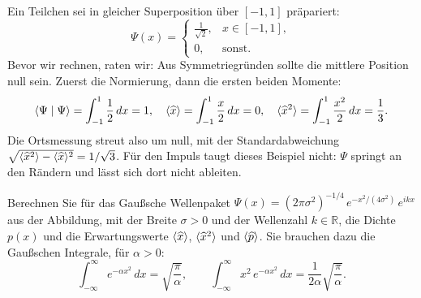 \begin{beispiel}
	Ein Teilchen sei in gleicher Superposition über $[-1,1]$ präpariert:
	\begin{equation}
		\Psi(x) = \begin{cases} \frac{1}{\sqrt2}, & x\in[-1,1], \\ 0, & \text{sonst}. \end{cases}
	\end{equation}
	Bevor wir rechnen, raten wir: Aus Symmetriegründen sollte die mittlere Position null sein. Zuerst die Normierung, dann die ersten beiden Momente:
	\begin{equation}
		\langle \Psi \mid \Psi \rangle = \int_{-1}^{1}\frac12\,dx = 1, \quad \langle\widehat{x}\rangle = \int_{-1}^{1}\frac{x}{2}\,dx = 0, \quad \langle\widehat{x}^2\rangle = \int_{-1}^{1}\frac{x^2}{2}\,dx = \frac13.
	\end{equation}
	Die Ortsmessung streut also um null, mit der Standardabweichung $\sqrt{\langle\widehat{x}^2\rangle - \langle\widehat{x}\rangle^2} = 1/\sqrt3$. Für den Impuls taugt dieses Beispiel nicht: $\Psi$ springt an den Rändern und lässt sich dort nicht ableiten.
\end{beispiel}

\begin{übung}
	Berechnen Sie für das Gaußsche Wellenpaket $\Psi(x) = (2\pi\sigma^2)^{-1/4}\,e^{-x^2/(4\sigma^2)}\,e^{ikx}$ aus der Abbildung, mit der Breite $\sigma>0$ und der Wellenzahl $k\in\mathbb{R}$, die Dichte $p(x)$ und die Erwartungswerte $\langle\widehat{x}\rangle$, $\langle\widehat{x}^2\rangle$ und $\langle\widehat{p}\rangle$. Sie brauchen dazu die Gaußschen Integrale, für $\alpha>0$:
	\begin{equation}\label{eq:gaussintegrale}
		\int_{-\infty}^{\infty} e^{-\alpha x^2}\,dx = \sqrt{\frac{\pi}{\alpha}}, \qquad \int_{-\infty}^{\infty} x^2\,e^{-\alpha x^2}\,dx = \frac{1}{2\alpha}\sqrt{\frac{\pi}{\alpha}}.
	\end{equation}
\end{übung}
